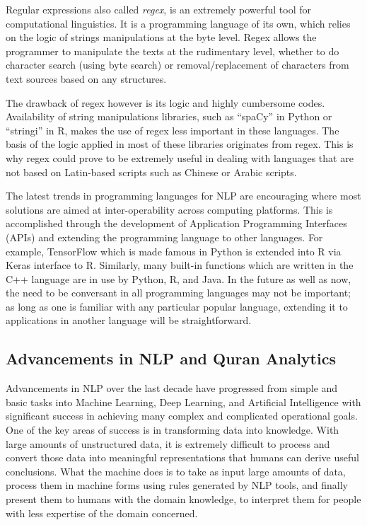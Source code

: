 \documentclass[
]{article}
\begin{document}
Regular expressions also called \emph{regex}, is an extremely powerful tool for computational linguistics. It is a programming language of its own, which relies on the logic of strings manipulations at the byte level. Regex allows the programmer to manipulate the texts at the rudimentary level, whether to do character search (using byte search) or removal/replacement of characters from text sources based on any structures.

The drawback of regex however is its logic and highly cumbersome codes. Availability of string manipulations libraries, such as ``spaCy'' in Python or ``stringi'' in R, makes the use of regex less important in these languages. The basis of the logic applied in most of these libraries originates from regex. This is why regex could prove to be extremely useful in dealing with languages that are not based on Latin-based scripts such as Chinese or Arabic scripts.

The latest trends in programming languages for NLP are encouraging where most solutions are aimed at inter-operability across computing platforms. This is accomplished through the development of Application Programming Interfaces (APIs) and extending the programming language to other languages. For example, TensorFlow which is made famous in Python is extended into R via Keras interface to R. Similarly, many built-in functions which are written in the C++ language are in use by Python, R, and Java. In the future as well as now, the need to be conversant in all programming languages may not be important; as long as one is familiar with any particular popular language, extending it to applications in another language will be straightforward.

\hypertarget{advancements-in-NLP-and-quran-analytics}{%
\subsection{Advancements in NLP and Quran Analytics}\label{advancements-in-NLP-and-quran-analytics}}

Advancements in NLP over the last decade have progressed from simple and basic tasks into Machine Learning, Deep Learning, and Artificial Intelligence with significant success in achieving many complex and complicated operational goals. One of the key areas of success is in transforming data into knowledge. With large amounts of unstructured data, it is extremely difficult to process and convert those data into meaningful representations that humans can derive useful conclusions. What the machine does is to take as input large amounts of data, process them in machine forms using rules generated by NLP tools, and finally present them to humans with the domain knowledge, to interpret them for people with less expertise of the domain concerned.
\end{document}
